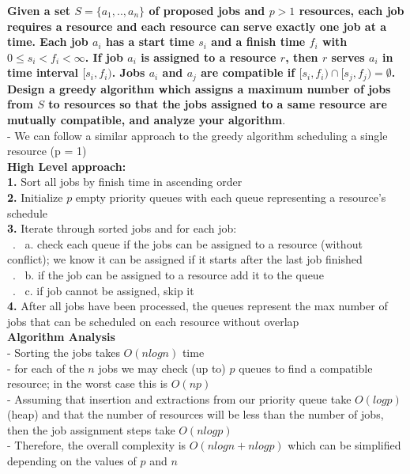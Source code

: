 \documentclass[letterpaper,12pt]{article}
\begin{document}
\begin{enumerate}
\textbf{Given a set $S=\{a_1,..,a_n\}$ of proposed jobs and $p>1$ resources, each job requires
a resource and each resource can serve exactly one job at a time. Each job $a_i$ has a
start time $s_i$ and a finish time $f_i$ with $0\leq s_i<f_i<\infty$. If job $a_i$ is
assigned to a resource $r$, then $r$ serves $a_i$ in time interval $[s_i,f_i)$. Jobs
$a_i$ and $a_j$ are compatible if $[s_i,f_i)\cap [s_j,f_j)=\emptyset$. Design a greedy
algorithm which assigns a maximum number of jobs from $S$ to resources so that the jobs
assigned to a same resource are mutually compatible, and analyze your algorithm}. \\
- We can follow a similar approach to the greedy algorithm scheduling a single resource (p = 1) \\
\textbf{High Level approach:} \\ 
\textbf{1.} Sort all jobs by finish time in ascending order \\
\textbf{2.} Initialize $p$ empty priority queues with each queue representing a resource's schedule \\
\textbf{3.} Iterate through sorted jobs and for each job: \\
\ . \ a. check each queue if the jobs can be assigned to a resource (without conflict); we know it can be assigned if it starts after the last job finished \\
\ . \ b. if the job can be assigned to a resource add it to the queue \\
\ . \ c. if job cannot be assigned, skip it \\
\textbf{4.} After all jobs have been processed, the queues represent the max number of jobs that can be scheduled on each resource without overlap \\

\textbf{Algorithm Analysis} \\ 
- Sorting the jobs takes $O(nlogn)$ time \\
- for each of the $n$ jobs we may check (up to) $p$ queues to find a compatible resource; in the worst case this is $O(np)$ \\
- Assuming that insertion and extractions from our priority queue take $O(logp)$ (heap) and that the number of resources will be less than the number of jobs, then the job assignment steps take $O(nlogp)$ \\
- Therefore, the overall complexity is $O(nlogn + nlogp)$ which can be simplified depending on the values of $p$ and $n$ \\


\end{enumerate}
\end{document}
